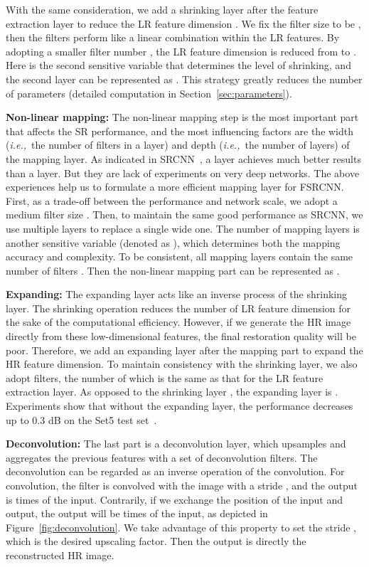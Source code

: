 \documentclass[runningheads]{llncs}
\newcommand{\ie}{\emph{i.e.,}}
\begin{document}
With the same consideration, we add a shrinking layer after the feature extraction layer to reduce the LR feature dimension . We fix the filter size to be , then the filters perform like a linear combination within the LR features. By adopting a smaller filter number , the LR feature dimension is reduced from  to . Here  is the second sensitive variable that determines the level of shrinking, and the second layer can be represented as .
This strategy greatly reduces the number of parameters (detailed computation in Section~\ref{sec:parameters}).

\noindent
\textbf{Non-linear mapping:} The non-linear mapping step is the most important part that affects the SR performance, and the most influencing factors are the width (\ie~the number of filters in a layer) and depth (\ie~the number of layers) of the mapping layer. As indicated in SRCNN~\cite{Dong2015}, a  layer achieves much better results than a  layer. But they are lack of experiments on very deep networks.
The above experiences help us to formulate a more efficient mapping layer for FSRCNN. First, as a trade-off between the performance and network scale, we adopt a medium filter size . Then, to maintain the same good performance as SRCNN, we use multiple  layers to replace a single wide one. The number of mapping layers is another sensitive variable (denoted as ), which determines both the mapping accuracy and complexity. To be consistent, all mapping layers contain the same number of filters . Then the non-linear mapping part can be represented as .


\noindent
\textbf{Expanding:} The expanding layer acts like an inverse process of the shrinking layer. The shrinking operation reduces the number of LR feature dimension for the sake of the computational efficiency. However, if we generate the HR image directly from these low-dimensional features, the final restoration quality will be poor. Therefore, we add an expanding layer after the mapping part to expand the HR feature dimension. To maintain consistency with the shrinking layer, we also adopt  filters, the number of which is the same as that for the LR feature extraction layer. As opposed to the shrinking layer , the expanding layer is . Experiments show that without the expanding layer, the performance decreases up to 0.3 dB on the Set5 test set~\cite{Bevilacqua2012}.

\noindent
\textbf{Deconvolution:} The last part is a deconvolution layer, which upsamples and aggregates the previous features with a set of deconvolution filters. The deconvolution can be regarded as an inverse operation of the convolution. For convolution, the filter is convolved with the image with a stride , and the output is  times of the input. Contrarily, if we exchange the position of the input and output, the output will be  times of the input, as depicted in Figure~\ref{fig:deconvolution}. We take advantage of this property to set the stride , which is the desired upscaling factor. Then the output is directly the reconstructed HR image.
\end{document}
